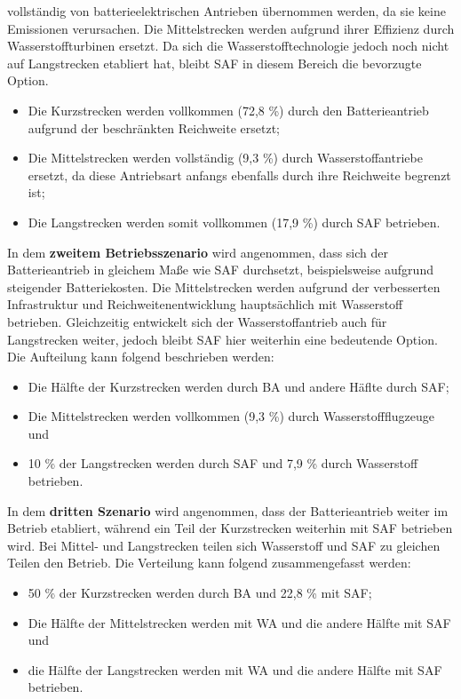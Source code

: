 vollständig von batterieelektrischen Antrieben übernommen werden, da sie keine Emissionen verursachen. 
Die Mittelstrecken werden aufgrund ihrer Effizienz durch Wasserstoffturbinen ersetzt. 
Da sich die Wasserstofftechnologie jedoch noch nicht auf Langstrecken etabliert hat, 
bleibt SAF in diesem Bereich die bevorzugte Option.
\begin{itemize}
    \item Die Kurzstrecken werden vollkommen (72,8 \%) durch den Batterieantrieb aufgrund der beschränkten Reichweite ersetzt;
    \item Die Mittelstrecken werden vollständig (9,3 \%) durch Wasserstoffantriebe ersetzt, 
	da diese Antriebsart anfangs ebenfalls durch ihre Reichweite begrenzt ist;
    \item Die Langstrecken werden somit vollkommen (17,9 \%) durch SAF betrieben.
\end{itemize}
%
In dem \textbf{zweitem Betriebsszenario} wird angenommen, dass sich der Batterieantrieb in gleichem Maße 
wie SAF durchsetzt, beispielsweise aufgrund steigender Batteriekosten. 
Die Mittelstrecken werden aufgrund der verbesserten Infrastruktur und 
Reichweitenentwicklung hauptsächlich mit Wasserstoff betrieben. 
Gleichzeitig entwickelt sich der Wasserstoffantrieb auch für Langstrecken weiter, 
jedoch bleibt SAF hier weiterhin eine bedeutende Option.
Die Aufteilung kann folgend beschrieben werden:
\begin{itemize}
    \item Die Hälfte der Kurzstrecken werden durch BA und andere Häflte durch SAF; 
    \item Die Mittelstrecken werden vollkommen (9,3 \%) durch Wasserstoffflugzeuge und
    \item 10 \% der Langstrecken werden durch SAF und 7,9 \% durch Wasserstoff betrieben.
\end{itemize}
In dem \textbf{dritten Szenario} wird angenommen, dass der Batterieantrieb weiter im Betrieb etabliert, 
während ein Teil der Kurzstrecken weiterhin mit SAF betrieben wird. Bei Mittel- 
und Langstrecken teilen sich Wasserstoff und SAF zu gleichen Teilen den Betrieb.
Die Verteilung kann folgend zusammengefasst werden:
\begin{itemize}
    \item 50 \% der Kurzstrecken werden durch BA und 22,8 \% mit SAF; 
    \item Die Hälfte der Mittelstrecken werden mit WA und die andere Hälfte mit SAF und 
    \item die Hälfte der Langstrecken werden mit WA und die andere Hälfte mit SAF betrieben. 
\end{itemize} %
